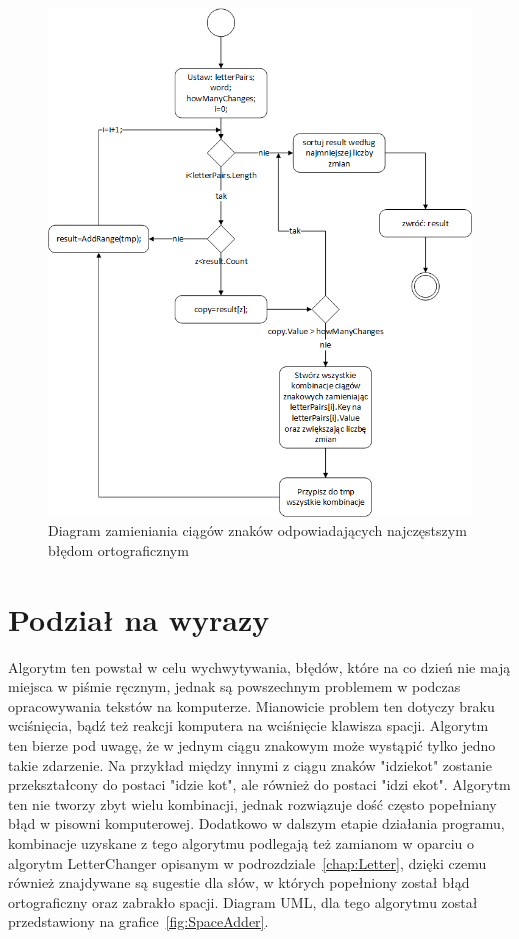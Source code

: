 \begin{figure} [H]
	\centering
	\includegraphics[width=1\linewidth]{rozdzial02/LetterChanger.png}
	\caption{Diagram zamieniania ciągów znaków odpowiadających najczęstszym błędom ortograficznym}
	\label{fig:LetterChanger}
\end{figure}

\section{Podział na wyrazy}
Algorytm ten powstał w celu wychwytywania, błędów, które na co dzień nie mają miejsca w piśmie ręcznym, jednak są powszechnym problemem w podczas opracowywania tekstów na komputerze. Mianowicie problem ten dotyczy braku wciśnięcia, bądź też reakcji komputera na wciśnięcie klawisza spacji. Algorytm ten bierze pod uwagę, że w jednym ciągu znakowym może wystąpić tylko jedno takie zdarzenie. Na przykład między innymi z ciągu znaków "idziekot" zostanie przekształcony do postaci "idzie kot", ale również do postaci "idzi ekot". Algorytm ten nie tworzy zbyt wielu kombinacji, jednak rozwiązuje dość często popełniany błąd w pisowni komputerowej. Dodatkowo w dalszym etapie działania programu, kombinacje uzyskane z tego algorytmu podlegają też zamianom w oparciu o algorytm LetterChanger opisanym w podrozdziale~\ref{chap:Letter}, dzięki czemu również znajdywane są sugestie dla słów, w których popełniony został błąd ortograficzny oraz zabrakło spacji. Diagram UML, dla tego algorytmu został przedstawiony na grafice~\ref{fig:SpaceAdder}. 

